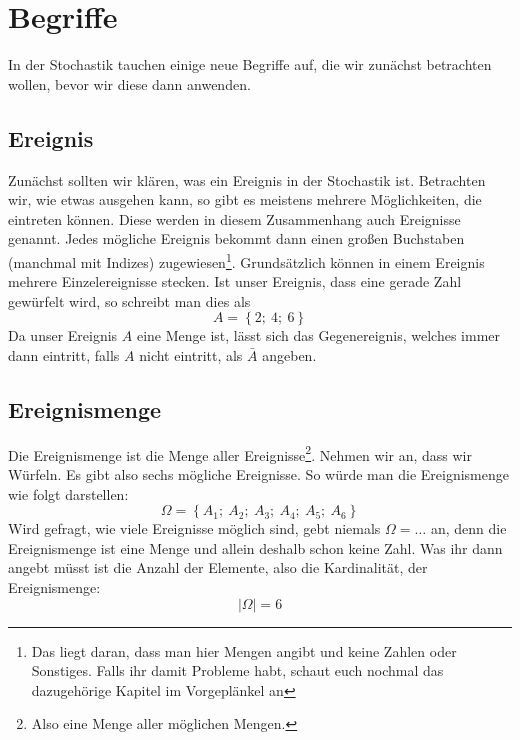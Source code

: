 \section{Begriffe}
	In der Stochastik tauchen einige neue Begriffe auf, die wir zunächst betrachten
	wollen, bevor wir diese dann anwenden.

	\subsection{Ereignis}
		Zunächst sollten wir klären, was ein Ereignis in der Stochastik ist.
		Betrachten wir, wie etwas ausgehen kann, so gibt es meistens mehrere
		Möglichkeiten, die eintreten können. Diese werden in diesem Zusammenhang auch
		Ereignisse genannt. Jedes mögliche Ereignis bekommt dann einen großen
		Buchstaben (manchmal mit Indizes) zugewiesen\footnote{Das liegt daran, dass
		man hier Mengen angibt und keine Zahlen oder Sonstiges. Falls ihr damit
		Probleme habt, schaut euch nochmal das dazugehörige Kapitel im Vorgeplänkel
		an}. Grundsätzlich können in einem Ereignis mehrere Einzelereignisse stecken.
		Ist unser Ereignis, dass eine gerade Zahl gewürfelt wird, so schreibt man dies
		als
		\[A=\left\lbrace 2;\ 4;\ 6\right\rbrace \]
		Da unser Ereignis \(A\) eine Menge ist, lässt sich das Gegenereignis, welches
		immer dann eintritt, falls \(A\) nicht eintritt, als \(\bar{A}\) angeben.

	\subsection{Ereignismenge}
		Die Ereignismenge ist die Menge aller Ereignisse\footnote{Also eine Menge
		aller möglichen Mengen.}. Nehmen wir an, dass wir Würfeln. Es gibt also sechs
		mögliche Ereignisse. So würde man die Ereignismenge wie folgt darstellen:
		\[\Omega=\left\lbrace A_1;\ A_2;\ A_3;\ A_4;\ A_5;\ A_6\right\rbrace \]
		Wird gefragt, wie viele Ereignisse möglich sind, gebt niemals
		\(\Omega=\ldots\) an, denn die Ereignismenge ist eine Menge und allein deshalb
		schon keine Zahl. Was ihr dann angebt müsst ist die Anzahl der Elemente, also
		die Kardinalität, der Ereignismenge:
		\[| \Omega |=6\]

